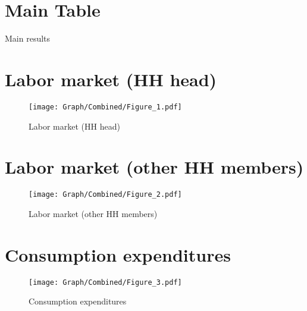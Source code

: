 \documentclass[10pt,a4paper]{article}
\begin{document}
\section{Main Table}
\begin{table}[H]\centering\caption{Main results}
\resizebox{\textwidth}{!}{}
\end{table}
\pagebreak
\section{Labor market (HH head)}
\begin{table}[H]\centering

\end{table}
\begin{figure}[H]\centering
\texttt{[image: Graph/Combined/Figure\_1.pdf]}
\caption{Labor market (HH head)} \label{fig:Fig_1}
\end{figure}
\begin{table}[H]\centering

\end{table}
\pagebreak
\section{Labor market (other HH members)}
\begin{table}[H]\centering

\end{table}
\begin{figure}[H]\centering
\texttt{[image: Graph/Combined/Figure\_2.pdf]}
\caption{Labor market (other HH members)} \label{fig:Fig_2}
\end{figure}
\begin{table}[H]\centering

\end{table}
\pagebreak
\section{Consumption expenditures}
\begin{table}[H]\centering

\end{table}
\begin{figure}[H]\centering
\texttt{[image: Graph/Combined/Figure\_3.pdf]}
\caption{Consumption expenditures} \label{fig:Fig_3}
\end{figure}
\begin{table}[H]\centering

\end{table}
\pagebreak
\end{document}
